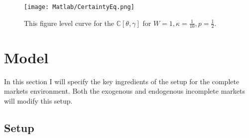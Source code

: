 \documentclass[12pt]{article}
\begin{document}
\begin{figure}[htbp]
\centering
\texttt{[image: Matlab/CertaintyEq.png]}
\caption{This figure level curve for the $\mathbb{C}[\theta,\gamma]$ for $W=1,\kappa=\frac{1}{10}, p=\frac{1}{2}$.}
\label{fig:CertaintyEq}
\end{figure}




\section{Model}
In this section I will specify the key ingredients of the setup for the complete markets environment. Both the exogenous and endogenous incomplete markets will modify this setup.
\subsection{Setup}
\end{document}
